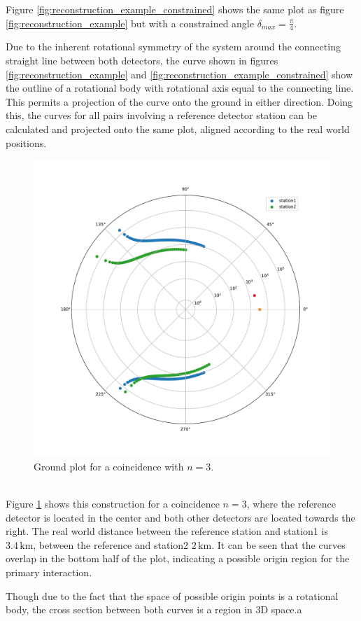 \documentclass[abstract,toc,los,lof,english,10pt,glossary,acronyms]{jluthesis}
\begin{document}
Figure \ref{fig:reconstruction_example_constrained} shows the same plot as figure \ref{fig:reconstruction_example} but with a constrained angle $\delta_{max} = \frac{\pi}{4}$.

Due to the inherent rotational symmetry of the system around the connecting straight line between both detectors, the curve shown in figures \ref{fig:reconstruction_example} and \ref{fig:reconstruction_example_constrained} show the outline of a rotational body with rotational axis equal to the connecting line. This permits a projection of the curve onto the ground in either direction. Doing this, the curves for all pairs involving a reference detector station can be calculated and projected onto the same plot, aligned according to the real world positions.
\begin{figure}[ht!]
	\centering
	\includegraphics[width=0.4\linewidth]{data/example_plot_ground}
	\caption{Ground plot for a coincidence with $n=3$.}
	\label{fig:reconstruction_example_ground}
\end{figure}\\
Figure \ref{fig:reconstruction_example_ground} shows this construction for a coincidence $n=3$, where the reference detector is located in the center and both other detectors are located towards the right. The real world distance between the reference station and station1 is $3.4\,\text{km}$, between the reference and station2 $2\,\text{km}$.
It can be seen that the curves overlap in the bottom half of the plot, indicating a possible origin region for the primary interaction.


Though due to the fact that the space of possible origin points is a rotational body, the cross section between both curves is a region in 3D space.a
\end{document}
